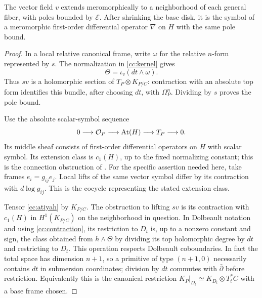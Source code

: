 \begin{lemma}
\label{cc:operator}
The vector field $v$ extends meromorphically to a neighborhood of each
general fiber, with poles bounded by $\mathcal E$.  After shrinking the
base disk, it is the symbol of a meromorphic first-order differential
operator $\nabla$ on $H$ with the same pole bound.
\end{lemma}

\begin{proof}
In a local relative canonical frame, write $\omega$ for the relative
$n$-form represented by $s$.  The normalization in
\eqref{cc:kernel} gives
\begin{equation}
                 \Theta=\iota_v(dt\wedge\omega).
\label{cc:contraction}
\end{equation}
Thus $sv$ is a holomorphic section of $T_P\otimes K_{P/C}$: contraction
with an absolute top form identifies this bundle, after choosing $dt$,
with $\Omega_P^n$.  Dividing by $s$ proves the pole bound.

Use the absolute scalar-symbol sequence
\begin{equation}
 0\longrightarrow\mathcal O_P\longrightarrow\operatorname{At}(H)
                   \longrightarrow T_P\longrightarrow0.
\label{cc:atiyah}
\end{equation}
Its middle sheaf consists of first-order differential operators on $H$
with scalar symbol.  Its extension class is $c_1(H)$, up to the fixed
normalizing constant; this is the connection obstruction of
\cite{Atiyah57}.  For the specific assertion needed here, take frames
$e_i=g_{ij}e_j$.  Local lifts of the same vector symbol differ by its
contraction with $d\log g_{ij}$.  This is the cocycle representing the
stated extension class.

Tensor \eqref{cc:atiyah} by $K_{P/C}$.  The obstruction to lifting $sv$
is its contraction with $c_1(H)$ in $H^1(K_{P/C})$ on the neighborhood
in question.  In Dolbeault notation and using
\eqref{cc:contraction}, its restriction to $D_t$ is, up to a nonzero
constant and sign, the class obtained from $h\wedge\Theta$ by dividing
its top holomorphic degree by $dt$ and restricting to $D_t$.
This operation respects Dolbeault coboundaries.  In fact the total space
has dimension $n+1$, so a primitive of type $(n+1,0)$ necessarily contains
$dt$ in submersion coordinates; division by $dt$ commutes with
$\bar\partial$ before restriction.  Equivalently this is the canonical
restriction $K_P|_{D_t}\simeq K_{D_t}\otimes T_t^*C$ with a base frame
chosen.


\end{proof}
